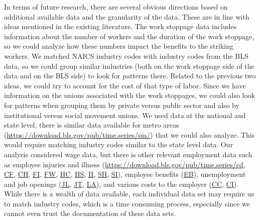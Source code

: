 \documentclass[reqno,11pt]{amsart}
\begin{document}
In terms of future research, there are several obvious directions based on 
additional available data and
the 
granularity of the data. These are in line with ideas mentioned in the existing literature.
The work stoppage data includes information about the 
number of workers and the duration of the work stoppage,
so we could analyze how these numbers impact the benefits to the striking 
workers. We matched NAICS industry codes with industry codes from the 
BLS data, so we could group similar industries (both on the work stoppage side
of the data and on the BLS side) to look for patterns there.
Related to the previous two ideas, we could try to account for the
cost of that type of labor. Since we have information on the unions 
associated with the work stoppages, we could also look for patterns 
when grouping them by private versus public sector and also by
institutional versus social movement unions. 
We used data at the national and state level, there is similar data
available for metro areas (\url{https://download.bls.gov/pub/time.series/sm/})
that we could also analyze. This would require matching industry codes
similar to the state level data. Our analysis considered wage data,
but there is other relevant employment data such as 
employee injuries and illness
(\url{https://download.bls.gov/pub/time.series/cd},
\href{https://download.bls.gov/pub/time.series/cf}{CF},
\href{https://download.bls.gov/pub/time.series/ch}{CH},
\href{https://download.bls.gov/pub/time.series/fi}{FI},
\href{https://download.bls.gov/pub/time.series/fw}{FW},
\href{https://download.bls.gov/pub/time.series/hc}{HC},
\href{https://download.bls.gov/pub/time.series/hs}{HS},    
\href{https://download.bls.gov/pub/time.series/ii}{II},
\href{https://download.bls.gov/pub/time.series/sh}{SH},
\href{https://download.bls.gov/pub/time.series/si}{SI}),
employee benefits
(\href{https://download.bls.gov/pub/time.series/eb}{EB}),
unemployment and job openings
(\href{https://download.bls.gov/pub/time.series/jl}{JL},
\href{https://download.bls.gov/pub/time.series/jt}{JT},
\href{https://download.bls.gov/pub/time.series/la}{LA}),
and various costs to the employer
(\href{https://download.bls.gov/pub/time.series/cc}{CC},
\href{https://download.bls.gov/pub/time.series/ci}{CI}).
While there is a wealth of data available, each individual data set
may require us to match industry codes, which is a time consuming
process, especially since we cannot even trust the documentation of
these data sets.















\end{document}
